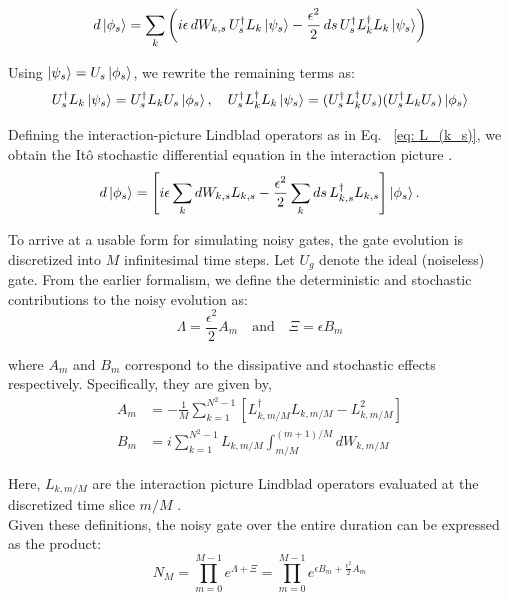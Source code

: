 \documentclass[9pt,a4paper,twocolumn,twoside]{tau-class/tau}
\begin{document}
\begin{equation}
d\ket{\phi_s} = \sum_k \left( i \epsilon \, dW_{k,s} \, U_s^\dagger L_k \ket{\psi_s} 
- \frac{\epsilon^2}{2} \, ds \, U_s^\dagger L_k^\dagger L_k \ket{\psi_s} \right)
\label{eq: d phi as sum}
\end{equation}

Using \( \ket{\psi_s} = U_s \ket{\phi_s} \), we rewrite the remaining terms as:
\begin{equation}
    U_s^\dagger L_k \ket{\psi_s} = U_s^\dagger L_k U_s \ket{\phi_s}, \quad 
U_s^\dagger L_k^\dagger L_k \ket{\psi_s} = (U_s^\dagger L_k^\dagger U_s)(U_s^\dagger L_k U_s) \ket{\phi_s}
\end{equation}

Defining the interaction-picture Lindblad operators as in Eq. ~\eqref{eq: L_(k_s)}, we obtain the Itô stochastic differential equation in the interaction picture \cite{dibartolomeo2023noisy}.
\begin{equation}
d\ket{\phi_s} = \left[ i \epsilon \sum_k dW_{k,s} L_{k,s} 
- \frac{\epsilon^2}{2} \sum_k ds \, L_{k,s}^\dagger L_{k,s} \right] \ket{\phi_s}.
\label{eq: stochastic unravelling in the interaction picture}
\end{equation}

To arrive at a usable form for simulating noisy gates, the gate evolution is discretized into $M$ infinitesimal time steps. Let $U_g$ denote the ideal (noiseless) gate. From the earlier formalism, we define the deterministic and stochastic contributions to the noisy evolution as:
\begin{equation}
    \Lambda = \frac{\epsilon^2}{2} A_m \quad \text{and} \quad \Xi = \epsilon B_m
    \label{eq: definition of A_m and B_m}
\end{equation}

where $A_m$ and $B_m$ correspond to the dissipative and stochastic effects respectively. Specifically, they are given by,
\begin{align}
    A_m &= -\frac{1}{M} \sum_{k=1}^{N^2-1} \left[ L_{k,m/M}^\dagger L_{k,m/M} - L_{k,m/M}^2 \right] \\
    B_m &= i \sum_{k=1}^{N^2-1} L_{k,m/M} \int_{m/M}^{(m+1)/M} dW_{k,m/M}
\end{align}

Here, $L_{k,m/M}$ are the interaction picture Lindblad operators evaluated at the discretized time slice $m/M$ \cite{dibartolomeo2023noisy}. \\
Given these definitions, the noisy gate over the entire duration can be expressed as the product:
\begin{equation}
    N_M = \prod_{m=0}^{M-1} e^{\Lambda + {\Xi}} = \prod_{m=0}^{M-1} e^{\epsilon B_m + \frac{\epsilon^2}{2} A_m}
    \label{eq: N_m expanded}
\end{equation}
\end{document}

